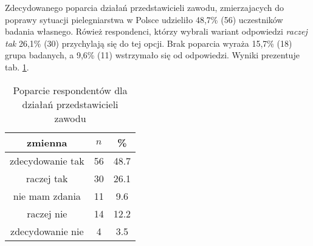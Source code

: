 

Zdecydowanego poparcia działań przedstawicieli zawodu, zmierzajacych do poprawy sytuacji pielegniarstwa w Polsce udzieliło 48,7\% (56) uczestników badania własnego. Rówież respondenci, którzy wybrali wariant odpowiedzi  \textit{raczej tak} 26,1\% (30) przychylają się do tej opcji. Brak poparcia wyraża 15,7\% (18) grupa badanych, a 9,6\% (11) wstrzymało się od odpowiedzi. Wyniki prezentuje tab. \ref{tab:Q19}.



\begin{table}[H]
\caption{Poparcie respondentów dla działań przedstawicieli zawodu}
\centering
\begin{tabular}{ | c | c | c |}
\hline
zmienna & $n$ & \% \\
\hline
zdecydowanie tak  &  56  & 48.7 \\
\hline
raczej tak  &  30  & 26.1\\
\hline
nie mam zdania  &  11  & 9.6 \\
\hline
raczej nie  &  14  & 12.2 \\
\hline
zdecydowanie nie  &  4  & 3.5\\
\hline
\end{tabular}
\label{tab:Q19}
\end{table}

